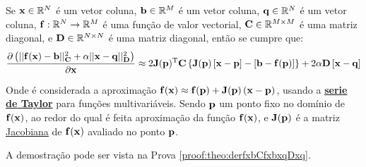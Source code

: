 \begin{theorem}\label{theo:derfxbCfxbxqDxq}
Se 
$\VECTOR{x}\in \mathbb{R}^N$ é um vetor coluna, 
$\VECTOR{b}\in \mathbb{R}^M$ é um vetor coluna,
$\VECTOR{q}\in \mathbb{R}^N$ é um vetor coluna, 
$\VECTOR{f}: \mathbb{R}^{N}\rightarrow \mathbb{R}^{M}$ é uma função de valor vectorial, 
$\MATRIX{C} \in \mathbb{R}^{M\times M}$ é uma matriz diagonal, e
$\MATRIX{D} \in \mathbb{R}^{N\times N}$ é uma matriz diagonal, 
então se cumpre que:
\begin{equation}
\frac{\partial \left(||\VECTOR{f}(\VECTOR{x})-\VECTOR{b}||_{\MATRIX{C}}^2+\alpha||\VECTOR{x}-\VECTOR{q}||_{\MATRIX{D}}^2\right)}{\partial \VECTOR{x}} \approx
2 \MATRIX{J}(\VECTOR{p})^{\transpose}\MATRIX{C}\left\{\MATRIX{J}(\VECTOR{p})\left[\VECTOR{x} - \VECTOR{p}\right]-\left[\VECTOR{b}-\VECTOR{f}(\VECTOR{p})\right] \right\}
+2\alpha\MATRIX{D}\left[\VECTOR{x}-\VECTOR{q}\right]
\end{equation}

Onde é considerada a aproximação
$\VECTOR{f}(\VECTOR{x})\approx \VECTOR{f}(\VECTOR{p})+\MATRIX{J}(\VECTOR{p})\left(\VECTOR{x}-\VECTOR{p}\right)$,
usando a \hyperref[def:taylor]{\textbf{serie de Taylor}} para funções multivariáveis. Sendo $\VECTOR{p}$ um ponto fixo no domínio de $\VECTOR{f}(\VECTOR{x})$,  ao redor do qual é feita  aproximação
da função $\VECTOR{f}(\VECTOR{x})$,
e $\MATRIX{J}(\VECTOR{p})$ é a matriz \hyperref[def:jacobian]{Jacobiana} \cite{Jacobian} de $\VECTOR{f}(\VECTOR{x})$ avaliado no ponto $\VECTOR{p}$.

A demostração pode ser vista na Prova \ref{proof:theo:derfxbCfxbxqDxq}.
\end{theorem}


